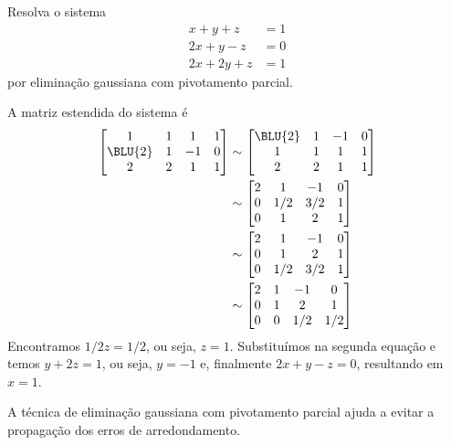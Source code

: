 \documentclass[
	12pt,				%
	oneside,			%
	a4paper,			%
	english,			%
	french,				%
	spanish,			%
	brazil				%
	]{abntex2}
\begin{document}
\begin{ex} Resolva o sistema
\begin{equation}
  \begin{split}
    x+y+z  &= 1\\
    2x+y-z &= 0\\
    2x+2y+z &= 1
  \end{split}
\end{equation}
por eliminação gaussiana com pivotamento parcial.
\end{ex}
\begin{sol}
A matriz estendida do sistema é
\begin{equation}
  \begin{split}
    \begin{bmatrix}
      1 &1&  1&1\\
      \BLU{2} &1& -1&0\\
      2 & 2 &1&1
    \end{bmatrix}
    &\sim
    \begin{bmatrix}
      \BLU{2} &1& -1&0\\
      1 &1&  1&1\\
      2 &2&  1&1
    \end{bmatrix}\\
    &\sim
    \begin{bmatrix}
      2 &1& -1&0\\
      0 &1/2& 3/2&1\\
      0 & 1 &2&1
    \end{bmatrix}\\
    &\sim
    \begin{bmatrix}
      2 &1& -1&0\\
      0 & 1 &2&1\\
      0 &1/2& 3/2&1
    \end{bmatrix}\\
    &\sim
    \begin{bmatrix}
      2 &1& -1&0\\
      0 & 1 &2&1\\
      0 &0& 1/2&1/2
    \end{bmatrix}
  \end{split}
\end{equation}
Encontramos $1/2z=1/2$, ou seja, $z=1$. Substituímos na segunda equação e temos $y+2z=1$, ou seja, $y=-1$ e, finalmente $2x+y-z=0$, resultando em $x=1$.
\end{sol}

A técnica de eliminação gaussiana com pivotamento parcial ajuda a evitar a propagação dos erros de arredondamento.
\end{document}
